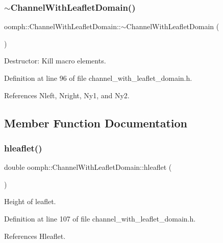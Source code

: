 \subsubsection{\texorpdfstring{$\sim$\+Channel\+With\+Leaflet\+Domain()}{~ChannelWithLeafletDomain()}}
{\footnotesize\ttfamily oomph\+::\+Channel\+With\+Leaflet\+Domain\+::$\sim$\+Channel\+With\+Leaflet\+Domain (\begin{DoxyParamCaption}{ }\end{DoxyParamCaption})\hspace{0.3cm}{\ttfamily [inline]}}



Destructor\+: Kill macro elements. 



Definition at line 96 of file channel\+\_\+with\+\_\+leaflet\+\_\+domain.\+h.



References Nleft, Nright, Ny1, and Ny2.



\subsection{Member Function Documentation}
\mbox{\label{classoomph_1_1ChannelWithLeafletDomain_af70ada72d505ebea468d1000b04c20e1}} 
\subsubsection{\texorpdfstring{hleaflet()}{hleaflet()}}
{\footnotesize\ttfamily double oomph\+::\+Channel\+With\+Leaflet\+Domain\+::hleaflet (\begin{DoxyParamCaption}{ }\end{DoxyParamCaption})\hspace{0.3cm}{\ttfamily [inline]}}



Height of leaflet. 



Definition at line 107 of file channel\+\_\+with\+\_\+leaflet\+\_\+domain.\+h.



References Hleaflet.



